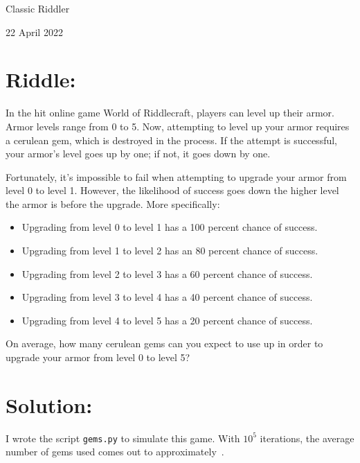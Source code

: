 \documentclass{article}
\begin{document}
\pagestyle{empty} %

\begin{center}
{\LARGE Classic Riddler}

\vspace{0.15in}

{\Large 22 April 2022}
\end{center}


\section*{Riddle:}

In the hit online game World of Riddlecraft, players can level up their armor. Armor levels range from 0 to 5.
Now, attempting to level up your armor requires a cerulean gem, which is destroyed in the process.
If the attempt is successful, your armor's level goes up by one; if not, it goes down by one.

Fortunately, it's impossible to fail when attempting to upgrade your armor from level 0 to level 1.
However, the likelihood of success goes down the higher level the armor is before the upgrade.
More specifically:

\begin{itemize}
\item Upgrading from level 0 to level 1 has a 100 percent chance of success.
\item Upgrading from level 1 to level 2 has an 80 percent chance of success.
\item Upgrading from level 2 to level 3 has a 60 percent chance of success.
\item Upgrading from level 3 to level 4 has a 40 percent chance of success.
\item Upgrading from level 4 to level 5 has a 20 percent chance of success.
\end{itemize}

On average, how many cerulean gems can you expect to use up in order to upgrade your armor from level 0 to level 5?


\section*{Solution:}

I wrote the script \texttt{gems.py} to simulate this game.
With $10^{5}$ iterations, the average number of gems used comes out to approximately \,.
\end{document}
